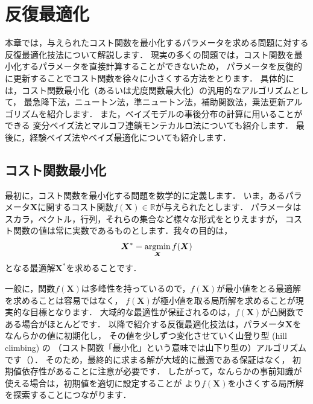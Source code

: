 \chapter{反復最適化}
\label{cha:optimization}

\begin{leadbox}
本章では，与えられたコスト関数を最小化するパラメータを求める問題に対する
反復最適化技法について解説します．
現実の多くの問題では，コスト関数を最小化するパラメータを直接計算することができないため，
パラメータを反復的に更新することでコスト関数を徐々に小さくする方法をとります．
具体的には，コスト関数最小化（あるいは尤度関数最大化）の汎用的なアルゴリズムとして，
最急降下法，ニュートン法，準ニュートン法，補助関数法，乗法更新アルゴリズムを紹介します．
また，ベイズモデルの事後分布の計算に用いることができる
変分ベイズ法とマルコフ連鎖モンテカルロ法についても紹介します．
最後に，経験ベイズ法やベイズ最適化についても紹介します．
\end{leadbox}

\section{コスト関数最小化}
\label{sec:cost_function_optimizaition}

最初に，コスト関数を最小化する問題を数学的に定義します．
いま，あるパラメータ$\bm{X}$に関するコスト関数$f(\bm{X}) \in \mathbb{R}$が与えられたとします．
パラメータはスカラ，ベクトル，行列，それらの集合など様々な形式をとりえますが，
コスト関数の値は常に実数であるものとします．我々の目的は，
\begin{align}
 \bm{X}^* = \mathop{\mathrm{argmin}}_{\bm{X}} f(\bm{X})
\end{align}
となる最適解$\bm{X}^*$を求めることです．

一般に，関数$f(\bm{X})$は多峰性を持っているので，$f(\bm{X})$が最小値をとる最適解を求めることは容易ではなく，
$f(\bm{X})$が極小値を取る局所解を求めることが現実的な目標となります．
大域的な最適性が保証されるのは，$f(\bm{X})$が凸関数である場合がほとんどです．
以降で紹介する反復最適化技法は，パラメータ$\bm{X}$をなんらかの値に初期化し，
その値を少しずつ変化させていく山登り型 (hill climbing) の
（コスト関数「最小化」という意味では山下り型の）アルゴリズムです（）．
そのため，最終的に求まる解が大域的に最適である保証はなく，
初期値依存性があることに注意が必要です．
したがって，なんらかの事前知識が使える場合は，初期値を適切に設定することが
より$f(\bm{X})$を小さくする局所解を探索することにつながります．


